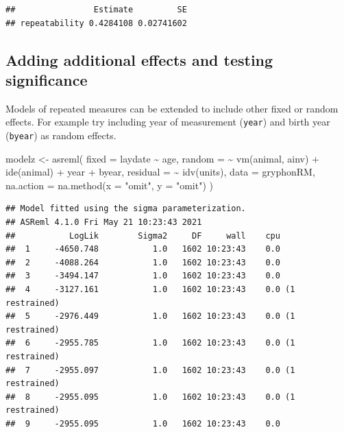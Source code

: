 \documentclass[
  12pt,
]{book}
\newenvironment{Shaded}{\begin{snugshade}}{\end{snugshade}}
\newcommand{\AttributeTok}[1]{\textcolor[rgb]{0.77,0.63,0.00}{#1}}
\newcommand{\FunctionTok}[1]{\textcolor[rgb]{0.00,0.00,0.00}{#1}}
\newcommand{\NormalTok}[1]{#1}
\newcommand{\OtherTok}[1]{\textcolor[rgb]{0.56,0.35,0.01}{#1}}
\newcommand{\SpecialCharTok}[1]{\textcolor[rgb]{0.00,0.00,0.00}{#1}}
\newcommand{\StringTok}[1]{\textcolor[rgb]{0.31,0.60,0.02}{#1}}
\begin{document}
\begin{verbatim}
##                Estimate         SE
## repeatability 0.4284108 0.02741602
\end{verbatim}

\hypertarget{adding-additional-effects-and-testing-significance}{%
\subsection{Adding additional effects and testing significance}\label{adding-additional-effects-and-testing-significance}}

Models of repeated measures can be extended to include other fixed or random effects. For example try including year of measurement (\texttt{year}) and birth year (\texttt{byear}) as random effects.

\begin{Shaded}
\begin{Highlighting}[]
\NormalTok{modelz }\OtherTok{\textless{}{-}} \FunctionTok{asreml}\NormalTok{(}
  \AttributeTok{fixed =}\NormalTok{ laydate }\SpecialCharTok{\textasciitilde{}}\NormalTok{ age,}
  \AttributeTok{random =} \SpecialCharTok{\textasciitilde{}} \FunctionTok{vm}\NormalTok{(animal, ainv) }\SpecialCharTok{+} \FunctionTok{ide}\NormalTok{(animal) }\SpecialCharTok{+}
\NormalTok{    year }\SpecialCharTok{+}\NormalTok{ byear,}
  \AttributeTok{residual =} \SpecialCharTok{\textasciitilde{}} \FunctionTok{idv}\NormalTok{(units),}
  \AttributeTok{data =}\NormalTok{ gryphonRM,}
  \AttributeTok{na.action =} \FunctionTok{na.method}\NormalTok{(}\AttributeTok{x =} \StringTok{"omit"}\NormalTok{, }\AttributeTok{y =} \StringTok{"omit"}\NormalTok{)}
\NormalTok{)}
\end{Highlighting}
\end{Shaded}

\begin{verbatim}
## Model fitted using the sigma parameterization.
## ASReml 4.1.0 Fri May 21 10:23:43 2021
##           LogLik        Sigma2     DF     wall    cpu
##  1     -4650.748           1.0   1602 10:23:43    0.0
##  2     -4088.264           1.0   1602 10:23:43    0.0
##  3     -3494.147           1.0   1602 10:23:43    0.0
##  4     -3127.161           1.0   1602 10:23:43    0.0 (1 restrained)
##  5     -2976.449           1.0   1602 10:23:43    0.0 (1 restrained)
##  6     -2955.785           1.0   1602 10:23:43    0.0 (1 restrained)
##  7     -2955.097           1.0   1602 10:23:43    0.0 (1 restrained)
##  8     -2955.095           1.0   1602 10:23:43    0.0 (1 restrained)
##  9     -2955.095           1.0   1602 10:23:43    0.0
\end{verbatim}
\end{document}
